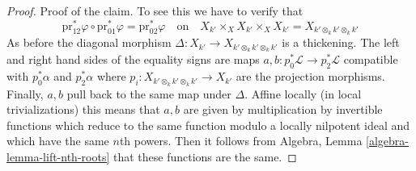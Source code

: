 \documentclass[10pt,a4paper]{amsart}
\theoremstyle{plain}
\theoremstyle{definition}
\theoremstyle{remark}
\numberwithin{equation}{subsection}
\begin{document}
\begin{proof}
\medskip\noindent
Proof of the claim. To see this we have to verify that
$$
\text{pr}_{12}^*\varphi \circ
\text{pr}_{01}^*\varphi =
\text{pr}_{02}^*\varphi
\quad\text{on}\quad
X_{k'} \times_X X_{k'} \times_X X_{k'} = X_{k' \otimes_k k' \otimes_k k'}
$$
As before the diagonal morphism
$\Delta : X_{k'} \to X_{k' \otimes_k k' \otimes_k k'}$
is a thickening. The left and right hand sides of the equality signs
are maps $a, b : p_0^*\mathcal{L} \to p_2^*\mathcal{L}$ compatible with
$p_0^*\alpha$ and $p_2^*\alpha$ where
$p_i : X_{k' \otimes_k k' \otimes_k k'} \to X_{k'}$
are the projection morphisms. Finally, $a, b$ pull back to the
same map under $\Delta$.
Affine locally (in local trivializations) this means that
$a, b$ are given by multiplication by invertible functions
which reduce to the same function modulo a locally nilpotent
ideal and which have the same $n$th powers. Then it follows
from Algebra, Lemma \ref{algebra-lemma-lift-nth-roots}
that these functions are the same.
\end{proof}
\end{document}
